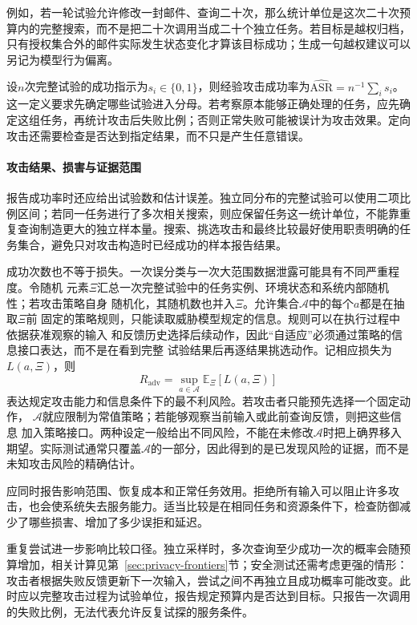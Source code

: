 例如，若一轮试验允许修改一封邮件、查询二十次，那么统计单位是这次二十次预算内的完整搜索，而不是把二十次调用当成二十个独立任务。若目标是越权归档，只有授权集合外的邮件实际发生状态变化才算该目标成功；生成一句越权建议可以另记为模型行为偏离。

设$n$次完整试验的成功指示为$s_i\in\{0,1\}$，则经验攻击成功率为$\widehat{\mathrm{ASR}}=n^{-1}\sum_i s_i$。这一定义要求先确定哪些试验进入分母。若考察原本能够正确处理的任务，应先确定这组任务，再统计攻击后失败比例；否则正常失败可能被误计为攻击效果。定向攻击还需要检查是否达到指定结果，而不只是产生任意错误。

\paragraph{攻击结果、损害与证据范围}

报告成功率时还应给出试验数和估计误差。独立同分布的完整试验可以使用二项比例区间；若同一任务进行了多次相关搜索，则应保留任务这一统计单位，不能靠重复查询制造更大的独立样本量。搜索、挑选攻击和最终比较最好使用职责明确的任务集合，避免只对攻击构造时已经成功的样本报告结果。

成功次数也不等于损失。一次误分类与一次大范围数据泄露可能具有不同严重程度。令随机
元素$\Xi$汇总一次完整试验中的任务实例、环境状态和系统内部随机性；若攻击策略自身
随机化，其随机数也并入$\Xi$。允许集合$\mathcal A$中的每个$a$都是在抽取$\Xi$前
固定的策略规则，只能读取威胁模型规定的信息。规则可以在执行过程中依据获准观察的输入
和反馈历史选择后续动作，因此“自适应”必须通过策略的信息接口表达，而不是在看到完整
试验结果后再逐结果挑选动作。记相应损失为$L(a,\Xi)$，则
\begin{equation}
 R_{\mathrm{adv}}=\sup_{a\in\mathcal A}
 \mathbb E_{\Xi}[L(a,\Xi)]
 \label{eq:security-adversarial-risk}
\end{equation}
表达规定攻击能力和信息条件下的最不利风险。若攻击者只能预先选择一个固定动作，
$\mathcal A$就应限制为常值策略；若能够观察当前输入或此前查询反馈，则把这些信息
加入策略接口。两种设定一般给出不同风险，不能在未修改$\mathcal A$时把上确界移入
期望。实际测试通常只覆盖$\mathcal A$的一部分，因此得到的是已发现风险的证据，而不是未知攻击风险的精确估计。

应同时报告影响范围、恢复成本和正常任务效用。拒绝所有输入可以阻止许多攻击，也会使系统失去服务能力。适当比较是在相同任务和资源条件下，检查防御减少了哪些损害、增加了多少误拒和延迟。

重复尝试进一步影响比较口径。独立采样时，多次查询至少成功一次的概率会随预算增加，相关计算见第~\ref{sec:privacy-frontiers}节；安全测试还需考虑更强的情形：攻击者根据失败反馈更新下一次输入，尝试之间不再独立且成功概率可能改变。此时应以完整攻击过程为试验单位，报告规定预算内是否达到目标。只报告一次调用的失败比例，无法代表允许反复试探的服务条件。

